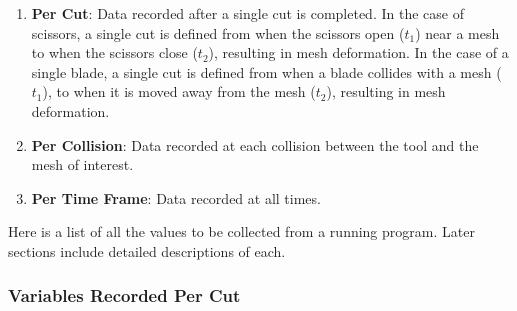 \begin{enumerate}[1.]
  \item \textbf{Per Cut}: Data recorded after a single cut is completed. In the case of scissors, a single cut is defined from when the scissors open ($t_1$) near a mesh to when the scissors close ($t_2$), resulting in mesh deformation. In the case of a single blade, a single cut is defined from when a blade collides with a mesh ($t_1$), to when it is moved away from the mesh ($t_2$), resulting in mesh deformation. %
  \item \textbf{Per Collision}: Data recorded at each collision between the tool and the mesh of interest.
  \item \textbf{Per Time Frame}: Data recorded at all times.
\end{enumerate}

Here is a list of all the values to be collected from a running program. Later sections include detailed descriptions of each.

\subsubsection{Variables Recorded Per Cut}

